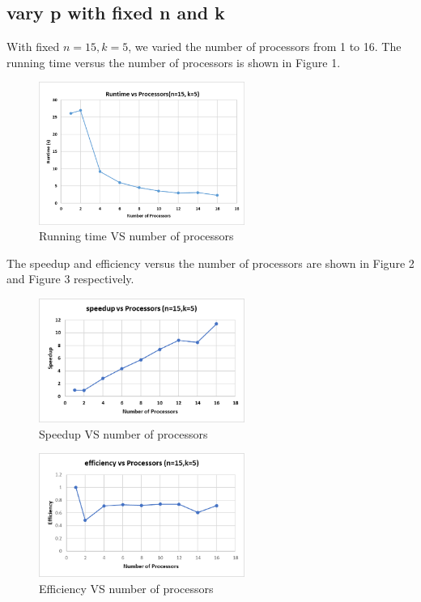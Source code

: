 \documentclass[twoside,12pt]{article}
\begin{document}
\subsection{vary p with fixed n and k}
	With fixed  $ n = 15, k = 5 $, we varied the number of processors from 1 to 16. The running time versus the number of processors is shown in Figure 1. \\
	\begin{figure}[H]
		\centering
		\includegraphics[width=0.6\textwidth]{pVSTime1}
		\caption{Running time VS number of processors}
	\end{figure}
    The speedup and efficiency versus the number of processors are shown in Figure 2 and Figure 3 respectively.
    \begin{figure}[H]
    	\centering
    	\includegraphics[width=0.6\textwidth]{speedupVSp}
    	\caption{Speedup VS number of processors}
    \end{figure}
   
    \begin{figure}[H]
	\centering
	\includegraphics[width=0.6\textwidth]{effiVSp}
	\caption{Efficiency VS number of processors}
    \end{figure}
\end{document}
